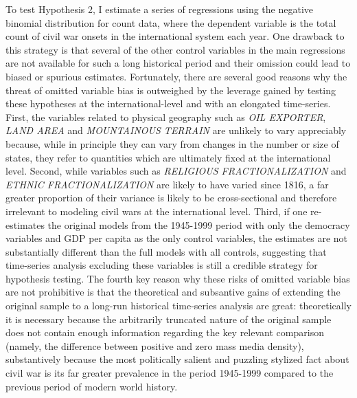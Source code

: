 \documentclass[12pt,article,oneside]{memoir}
\begin{document}
To test Hypothesis 2, I estimate a series of regressions using the
negative binomial distribution for count data, where the dependent
variable is the total count of civil war onsets in the international
system each year. One drawback to this strategy is that several of the
other control variables in the main regressions are not available for
such a long historical period and their omission could lead to biased or
spurious estimates. Fortunately, there are several good reasons why the
threat of omitted variable bias is outweighed by the leverage gained by
testing these hypotheses at the international-level and with an
elongated time-series. First, the variables related to physical
geography such as \emph{OIL EXPORTER}, \emph{LAND AREA} and
\emph{MOUNTAINOUS TERRAIN} are unlikely to vary appreciably because,
while in principle they can vary from changes in the number or size of
states, they refer to quantities which are ultimately fixed at the
international level. Second, while variables such as \emph{RELIGIOUS
FRACTIONALIZATION} and \emph{ETHNIC FRACTIONALIZATION} are likely to
have varied since 1816, a far greater proportion of their variance is
likely to be cross-sectional and therefore irrelevant to modeling civil
wars at the international level. Third, if one re-estimates the original
models from the 1945-1999 period with only the democracy variables and
GDP per capita as the only control variables, the estimates are not
substantially different than the full models with all controls,
suggesting that time-series analysis excluding these variables is still
a credible strategy for hypothesis testing. The fourth key reason why
these risks of omitted variable bias are not prohibitive is that the
theoretical and subsantive gains of extending the original sample to a
long-run historical time-series analysis are great: theoretically it is
necessary because the arbitrarily truncated nature of the original
sample does not contain enough information regarding the key relevant
comparison (namely, the difference between positive and zero mass media
density), substantively because the most politically salient and
puzzling stylized fact about civil war is its far greater prevalence in
the period 1945-1999 compared to the previous period of modern world
history.
\end{document}

